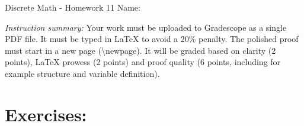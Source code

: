 \documentclass[12pt]{article}
\begin{document}
\begin{center}
    {\LARGE Discrete Math - Homework 11}  \Large \newline
    Name:
\end{center}

\emph{Instruction summary:} Your work must be uploaded to Gradescope as a single PDF file. It must be typed in LaTeX to avoid a 20\% penalty. The polished proof must start in a new page (\textbackslash newpage). It will be graded based on clarity (2 points), LaTeX prowess (2 points) and proof quality (6 points, including for example structure and variable definition).

\section*{Exercises:}
\end{document}
